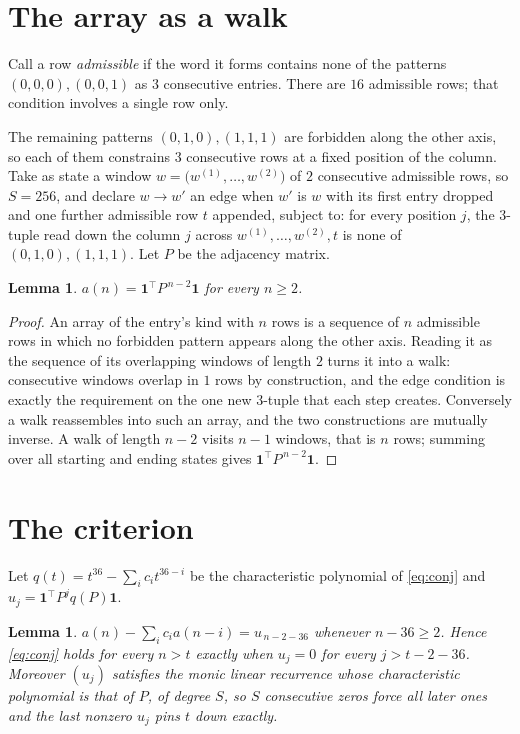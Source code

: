 \documentclass[11pt,a4paper]{article}
\theoremstyle{plain}
\newtheorem{lemma}[theorem]{Lemma}
\theoremstyle{definition}
\begin{document}
\section{The array as a walk}

Call a row \emph{admissible} if the word it forms contains none of the patterns
$(0,0,0), (0,0,1)$ as $3$ consecutive entries. There are $16$ admissible rows; that condition
involves a single row only.

The remaining patterns $(0,1,0), (1,1,1)$ are forbidden along the other axis, so each of them
constrains $3$ consecutive rows at a fixed position of the column. Take as state a
window $w=\bigl(w^{(1)},\dots,w^{(2)}\bigr)$ of $2$ consecutive admissible
rows, so $S=256$, and declare $w\to w'$ an edge when $w'$ is $w$ with its first entry
dropped and one further admissible row $t$ appended, subject to: for every position
$j$, the $3$-tuple read down the column $j$ across $w^{(1)},\dots,w^{(2)},t$
is none of $(0,1,0), (1,1,1)$. Let $P$ be the adjacency matrix.

\begin{lemma}\label{lem:walk}
$a(n)=\mathbf{1}^{\!\top}P^{\,n-2}\mathbf{1}$ for every $n\ge2$.
\end{lemma}

\begin{proof}
An array of the entry's kind with $n$ rows is a sequence of $n$ admissible rows in
which no forbidden pattern appears along the other axis. Reading it as the sequence of its
overlapping windows of length $2$ turns it into a walk: consecutive windows overlap in
$1$ rows by construction, and the edge condition is exactly the requirement on the one
new $3$-tuple that each step creates. Conversely a walk reassembles into such an array,
and the two constructions are mutually inverse. A walk of length $n-2$ visits $n-1$
windows, that is $n$ rows; summing over all starting and ending states gives
$\mathbf{1}^{\!\top}P^{\,n-2}\mathbf{1}$.
\end{proof}

\section{The criterion}

Let $q(t)=t^{36}-\sum_i c_i t^{36-i}$ be the characteristic polynomial of
\eqref{eq:conj} and $u_j=\mathbf{1}^{\!\top}P^{j}q(P)\mathbf{1}$.

\begin{lemma}\label{lem:crit}
$a(n)-\sum_i c_i a(n-i)=u_{\,n-2-36}$ whenever $n-36\ge2$. Hence
\eqref{eq:conj} holds for every $n>t$ exactly when $u_j=0$ for every
$j>t-2-36$. Moreover $(u_j)$ satisfies the monic linear recurrence whose
characteristic polynomial is that of $P$, of degree $S$, so $S$ consecutive zeros force all
later ones and the last nonzero $u_j$ pins $t$ down exactly.
\end{lemma}
\end{document}
